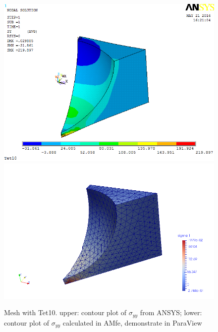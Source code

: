 \begin{figure}[htbp]
	\begin{center}
		\includegraphics[width=13cm,clip]{Tet10_Syy.png} 		
		\includegraphics[width=13cm,clip]{Tet10_Syy_P.png} 		
		\caption{Mesh with Tet10. upper: contour plot of $\sigma_{yy}$ from ANSYS; lower: contour plot of $\sigma_{yy}$ calculated in AMfe, demonstrate in ParaView} \label{fig: Tet10_Syy}
	\end{center}
\end{figure}

